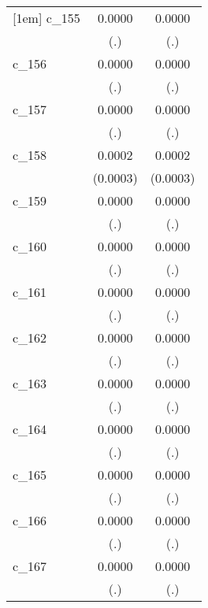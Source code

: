 {\begin{tabular}{l*{2}{c}}
[1em]
c\_155       &      0.0000        &      0.0000        \\
            &         (.)        &         (.)        \\
[1em]
c\_156       &      0.0000        &      0.0000        \\
            &         (.)        &         (.)        \\
[1em]
c\_157       &      0.0000        &      0.0000        \\
            &         (.)        &         (.)        \\
[1em]
c\_158       &      0.0002        &      0.0002        \\
            &    (0.0003)        &    (0.0003)        \\
[1em]
c\_159       &      0.0000        &      0.0000        \\
            &         (.)        &         (.)        \\
[1em]
c\_160       &      0.0000        &      0.0000        \\
            &         (.)        &         (.)        \\
[1em]
c\_161       &      0.0000        &      0.0000        \\
            &         (.)        &         (.)        \\
[1em]
c\_162       &      0.0000        &      0.0000        \\
            &         (.)        &         (.)        \\
[1em]
c\_163       &      0.0000        &      0.0000        \\
            &         (.)        &         (.)        \\
[1em]
c\_164       &      0.0000        &      0.0000        \\
            &         (.)        &         (.)        \\
[1em]
c\_165       &      0.0000        &      0.0000        \\
            &         (.)        &         (.)        \\
[1em]
c\_166       &      0.0000        &      0.0000        \\
            &         (.)        &         (.)        \\
[1em]
c\_167       &      0.0000        &      0.0000        \\
            &         (.)        &         (.)        \\

\end{tabular}}

